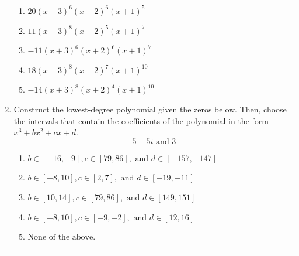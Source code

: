 \documentclass[14pt]{extbook}
\newcommand{\litem}[1]{\item#1\hspace*{-1cm}\rule{\textwidth}{0.4pt}}
\begin{document}
\begin{enumerate}
{\begin{center}
\end{center}
\begin{enumerate}[label=\Alph*.]
\item \( 20(x + 3)^{6} (x + 2)^{6} (x + 1)^{5} \)
\item \( 11(x + 3)^{8} (x + 2)^{5} (x + 1)^{7} \)
\item \( -11(x + 3)^{6} (x + 2)^{6} (x + 1)^{7} \)
\item \( 18(x + 3)^{8} (x + 2)^{7} (x + 1)^{10} \)
\item \( -14(x + 3)^{8} (x + 2)^{4} (x + 1)^{10} \)

\end{enumerate} }
\litem{
Construct the lowest-degree polynomial given the zeros below. Then, choose the intervals that contain the coefficients of the polynomial in the form $x^3+bx^2+cx+d$.\[ 5 - 5 i \text{ and } 3 \]\begin{enumerate}[label=\Alph*.]
\item \( b \in [-16, -9], c \in [79, 86], \text{ and } d \in [-157, -147] \)
\item \( b \in [-8, 10], c \in [2, 7], \text{ and } d \in [-19, -11] \)
\item \( b \in [10, 14], c \in [79, 86], \text{ and } d \in [149, 151] \)
\item \( b \in [-8, 10], c \in [-9, -2], \text{ and } d \in [12, 16] \)
\item \( \text{None of the above.} \)

\end{enumerate} }
\end{enumerate}
\end{document}
